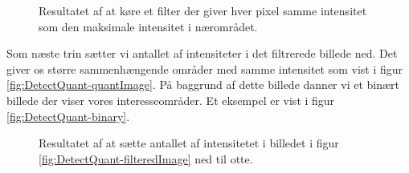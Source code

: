 \begin{figure}[htp]
  \centering
  \caption{Resultatet af at køre et filter der giver hver pixel samme intensitet som den maksimale intensitet i nærområdet.}
  \label{fig:DetectQuant-filteredImage}  
\end{figure}

Som næste trin sætter vi antallet af intensiteter i det filtrerede billede ned. Det giver os større sammenhængende områder med samme intensitet som vist i figur \vref{fig:DetectQuant-quantImage}. På baggrund af dette billede danner vi et binært billede der viser vores interesseområder. Et eksempel er vist i figur \vref{fig:DetectQuant-binary}.

\begin{figure}[htp]
  \centering
  \caption{Resultatet af at sætte antallet af intensitetet i billedet i figur \vref{fig:DetectQuant-filteredImage} ned til otte.}
  \label{fig:DetectQuant-quantImage}  
\end{figure}

